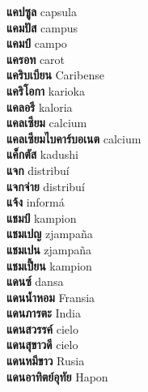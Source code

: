 \textbf{ แคปซูล  } capsula \\
\textbf{ แคมปัส  } campus \\
\textbf{ แคมป์  } campo \\
\textbf{ แครอท  } carot \\
\textbf{ แคริบเบียน  } Caribense \\
\textbf{ แคริโอกา  } karioka \\
\textbf{ แคลอรี  } kaloria \\
\textbf{ แคลเซียม  } calcium \\
\textbf{ แคลเซียมไบคาร์บอเนต  } calcium \\
\textbf{ แค็กตัส  } kadushi \\
\textbf{ แจก  } distribuí \\
\textbf{ แจกจ่าย  } distribuí \\
\textbf{ แจ้ง  } informá \\
\textbf{ แชมป์  } kampion \\
\textbf{ แชมเปญ  } zjampaña \\
\textbf{ แชมเปน  } zjampaña \\
\textbf{ แชมเปี้ยน  } kampion \\
\textbf{ แดนซ์  } dansa \\
\textbf{ แดนน้ำหอม  } Fransia \\
\textbf{ แดนภารตะ  } India \\
\textbf{ แดนสวรรค์  } cielo \\
\textbf{ แดนสุขาวดี  } cielo \\
\textbf{ แดนหมีขาว  } Rusia \\
\textbf{ แดนอาทิตย์อุทัย  } Hapon \\

